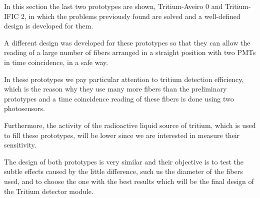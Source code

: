 In this section the last two prototypes are shown, Tritium-Aveiro 0 and Tritium-IFIC 2, in which the problems previously found are solved and a well-defined design is developed for them.

A different design was developed for these prototypes so that they can allow the reading of a large number of fibers arranged in a straight position with two PMTs in time coincidence, in a safe way.

In these prototypes we pay particular attention to tritium detection efficiency, which is the reason why they use many more fibers than the preliminary prototypes and a time coincidence reading of these fibers is done using two photosensors.

Furthermore, the activity of the radioactive liquid source of tritium, which is used to fill these prototypes, will be lower since we are interested in measure their sensitivity.

The design of both prototypes is very similar and their objective is to test the subtle effects caused by the little difference, such us the diameter of the fibers used, and to choose the one with the best results which will be the final design of the Tritium detector module.